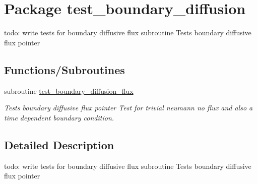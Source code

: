 \hypertarget{a00076}{
\section{Package test\_\-boundary\_\-diffusion}
\label{a00076}
}
todo: write tests for boundary diffusive flux subroutine Tests boundary diffusive flux pointer  


\subsection*{Functions/Subroutines}
\begin{CompactItemize}
\item 
\hypertarget{a00076_e68802fae7dcb71ee399263637ee5b85}{
subroutine \hyperlink{a00076_e68802fae7dcb71ee399263637ee5b85}{test\_\-boundary\_\-diffusion\_\-flux}}
\label{a00076_e68802fae7dcb71ee399263637ee5b85}

\begin{CompactList}\small\item\em Tests boundary diffusive flux pointer Test for trivial neumann no flux and also a time dependent boundary condition. \item\end{CompactList}\end{CompactItemize}


\subsection{Detailed Description}
todo: write tests for boundary diffusive flux subroutine Tests boundary diffusive flux pointer 


